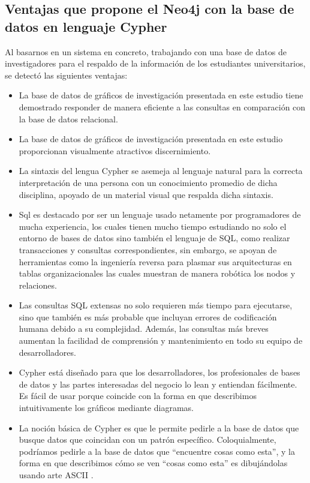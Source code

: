 \subsection{Ventajas que propone el Neo4j con la base de datos en lenguaje Cypher}
Al basarnos en un sistema en concreto, trabajando con una base de datos de investigadores para el respaldo de la información de los estudiantes universitarios, se detectó las siguientes ventajas:
\begin{itemize}
    \item La base de datos de gráficos de investigación presentada en este estudio tiene demostrado responder de manera eficiente a las consultas en comparación con la base de datos relacional.
    \item La base de datos de gráficos de investigación presentada en este estudio proporcionan visualmente atractivos discernimiento.
    \item La sintaxis del lengua Cypher se asemeja al lenguaje natural para la correcta interpretación de una persona con un conocimiento promedio de dicha disciplina, apoyado de un material visual que respalda dicha sintaxis.
    \item Sql es destacado por ser un lenguaje usado netamente por programadores de mucha experiencia, los cuales tienen mucho tiempo estudiando no solo el entorno de bases de datos sino también el lenguaje de SQL, como realizar transacciones y consultas correspondientes, sin embargo, se apoyan de herramientas como la ingeniería reversa para plasmar sus arquitecturas en tablas organizacionales las cuales muestran de manera robótica los nodos y relaciones.
    \item Las consultas SQL extensas no solo requieren más tiempo para ejecutarse, sino que también es más probable que incluyan errores de codificación humana debido a su complejidad. Además, las consultas más breves aumentan la facilidad de comprensión y mantenimiento en todo su equipo de desarrolladores.
    \item Cypher está diseñado para que los desarrolladores, los profesionales de bases de datos y las partes interesadas del negocio lo lean y entiendan fácilmente. Es fácil de usar porque coincide con la forma en que describimos intuitivamente los gráficos mediante diagramas.
    \item La noción básica de Cypher es que le permite pedirle a la base de datos que busque datos que coincidan con un patrón específico. Coloquialmente, podríamos pedirle a la base de datos que “encuentre cosas como esta”, y la forma en que describimos cómo se ven “cosas como esta” es dibujándolas usando arte ASCII .

\end{itemize}
